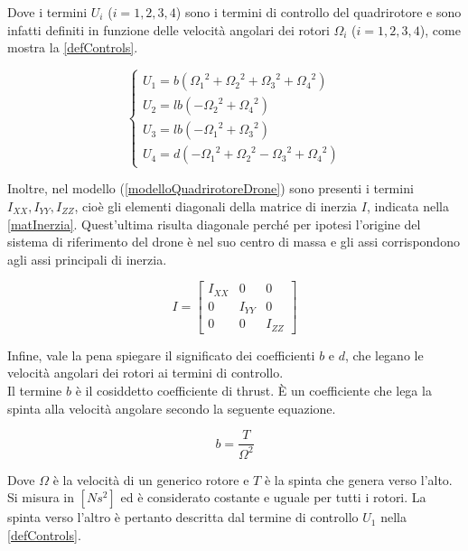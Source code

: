 Dove i termini $U_i$ ($i = 1,2,3,4$) sono i termini di controllo del quadrirotore e sono infatti definiti in funzione delle velocità angolari dei rotori $\Omega_i$ ($i = 1,2,3,4$), come mostra la \ref{defControls}.

\begin{equation}
	\begin{cases}
	U_1 = b({\Omega_1}^2 + {\Omega_2}^2 + {\Omega_3}^2 + {\Omega_4}^2) \\
	U_2 = lb(- {\Omega_2}^2 + {\Omega_4}^2) \\
	U_3 = lb(- {\Omega_1}^2 + {\Omega_3}^2) \\
	U_4 = d(- {\Omega_1}^2 + {\Omega_2}^2 - {\Omega_3}^2 + {\Omega_4}^2)
	\end{cases}
	\label{defControls}
\end{equation}

Inoltre, nel modello (\ref{modelloQuadrirotoreDrone}) sono presenti i termini $I_{XX}, I_{YY}, I_{ZZ}$, cioè gli elementi diagonali della matrice di inerzia $I$, indicata nella \ref{matInerzia}. Quest'ultima risulta diagonale perché per ipotesi l'origine del sistema di riferimento del drone è nel suo centro di massa e gli assi corrispondono agli assi principali di inerzia.
 
\begin{equation}
I =
\begin{bmatrix}
I_{XX} & 0 & 0\\
0 & I_{YY} & 0\\
0 & 0 & I_{ZZ}
\end{bmatrix}
\label{matInerzia}
\end{equation}

Infine, vale la pena spiegare il significato dei coefficienti $b$ e $d$, che legano le velocità angolari dei rotori ai termini di controllo.\\

Il termine $b$ è il cosiddetto coefficiente di thrust. È un coefficiente che lega la spinta alla velocità angolare secondo la seguente equazione.

\begin{equation}
	b = \frac{T}{\Omega^2}
	\label{thrustCoeff}
\end{equation}

Dove $\Omega$ è la velocità di un generico rotore e $T$ è la spinta che genera verso l'alto. Si misura in $[N s^2]$ ed è considerato costante e uguale per tutti i rotori. La spinta verso l'altro è pertanto descritta dal termine di controllo $U_1$ nella \ref{defControls}.\\

